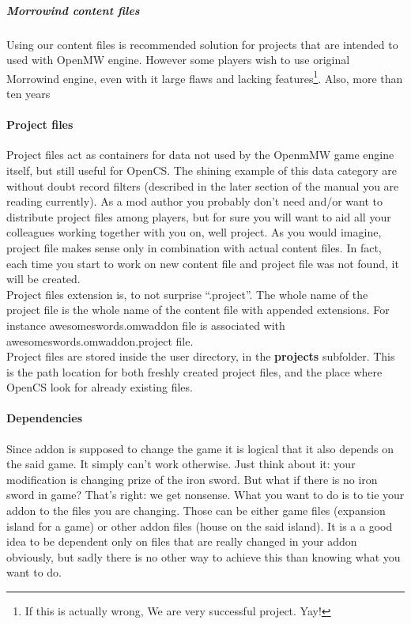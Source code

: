 \subparagraph{Morrowind content files}
Using our content files is recommended solution for projects that are intended to used with Open{MW} engine. However some players wish to use original Morrowind engine, even with it large flaws and lacking features\footnote{If this is actually wrong, We are very successful project. Yay!}. Also, more than ten years

\paragraph{Project files}
Project files act as containers for data not used by the Openm{MW} game engine itself, but still useful for OpenCS. The shining example of this data category are without doubt record filters (described in the later section of the manual you are reading currently). As a mod author you probably don't need and/or want to distribute project files among players, but for sure you will want to aid all your colleagues working together with you on, well project. As you would imagine, project file makes sense only in combination with actual content files. In fact, each time you start to work on new content file and project file was not found, it will be created.\\ 
Project files extension is, to not surprise ``.project''. The whole name of the project file is the whole name of the content file with appended extensions. For instance awesomeswords.omwaddon file is associated with awesomeswords.omwaddon.project file.\\

Project files are stored inside the user directory, in the \textbf{projects} subfolder. This is the path location for both freshly created project files, and the place where Open{CS} look for already existing files.\\

\paragraph{Dependencies}
Since addon is supposed to change the game it is logical that it also depends on the said game. It simply can't work otherwise. Just think about it: your modification is changing prize of the iron sword. But what if there is no iron sword in game? That's right: we get nonsense. What you want to do is to tie your addon to the files you are changing. Those can be either game files (expansion island for a game) or other addon files (house on the said island). It is a a good idea to be dependent only on files that are really changed in your addon obviously, but sadly there is no other way to achieve this than knowing what you want to do.\\

